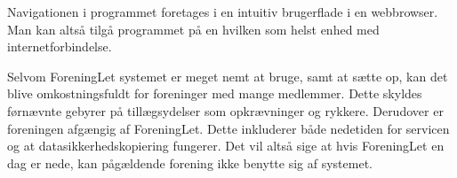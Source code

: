 Navigationen i programmet foretages i en intuitiv brugerflade i en webbrowser. Man kan altså tilgå programmet på en hvilken som helst enhed med internetforbindelse. 


Selvom ForeningLet systemet er meget nemt at bruge, samt at sætte op, kan det blive omkostningsfuldt for foreninger med mange medlemmer. Dette skyldes førnævnte gebyrer på tillægsydelser som opkrævninger og rykkere. Derudover er foreningen afgængig af ForeningLet. Dette inkluderer både nedetiden for servicen og at datasikkerhedskopiering fungerer. Det vil altså sige at hvis ForeningLet en dag er nede, kan pågældende forening ikke benytte sig af systemet.

